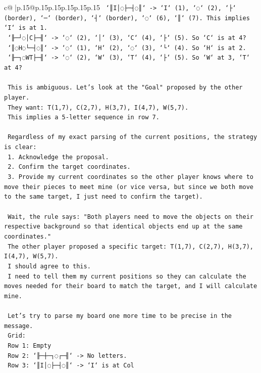 \documentclass{article}
\begin{document}
{\begin{supertabular}{c@{$\;$}|p{.15\linewidth}@{}p{.15\linewidth}p{.15\linewidth}p{.15\linewidth}p{.15\linewidth}p{.15\linewidth}}
{{{\texttt{   `║I│◌├─┤◌║` {-}> `I` (1), `◌` (2), `├` (border), `─` (border), `┤` (border), `◌` (6), `║` (7). This implies `I` is at 1.} \\
\texttt{   `╟─┘◌│C├─╢` {-}> `◌` (2), `│` (3), `C` (4), `├` (5). So `C` is at 4?} \\
\texttt{   `║◌H◌└─┤◌║` {-}> `◌` (1), `H` (2), `◌` (3), `└` (4). So `H` is at 2.} \\
\texttt{   `╟─┐◌WT├─╢` {-}> `◌` (2), `W` (3), `T` (4), `├` (5). So `W` at 3, `T` at 4?} \\
\\ 
\texttt{   This is ambiguous. Let's look at the "Goal" proposed by the other player.} \\
\texttt{   They want: T(1,7), C(2,7), H(3,7), I(4,7), W(5,7).} \\
\texttt{   This implies a 5{-}letter sequence in row 7.} \\
\\ 
\texttt{   Regardless of my exact parsing of the current positions, the strategy is clear:} \\
\texttt{   1. Acknowledge the proposal.} \\
\texttt{   2. Confirm the target coordinates.} \\
\texttt{   3. Provide my current coordinates so the other player knows where to move their pieces to meet mine (or vice versa, but since we both move to the same target, I just need to confirm the target).} \\
\\ 
\texttt{   Wait, the rule says: "Both players need to move the objects on their respective background so that identical objects end up at the same coordinates."} \\
\texttt{   The other player proposed a specific target: T(1,7), C(2,7), H(3,7), I(4,7), W(5,7).} \\
\texttt{   I should agree to this.} \\
\texttt{   I need to tell them my current positions so they can calculate the moves needed for their board to match the target, and I will calculate mine.} \\
\\ 
\texttt{   Let's try to parse my board one more time to be precise in the message.} \\
\texttt{   Grid:} \\
\texttt{   Row 1: Empty} \\
\texttt{   Row 2: `╟─┼─┐◌┌─╢` {-}> No letters.} \\
\texttt{   Row 3: `║I│◌├─┤◌║` {-}> `I` is at Col} \\
            }
        }
    }
     \\ \\


\end{supertabular}}
\end{document}
